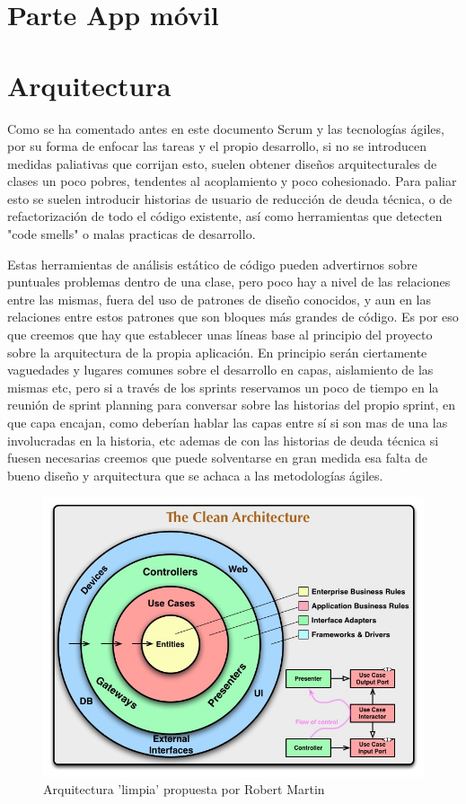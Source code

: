 \documentclass[../pfc.tex]{subfiles}
\begin{document}
	
	
	\section{Parte App móvil}
	
	\section{Arquitectura}
	
	Como se ha comentado antes en este documento Scrum y las tecnologías ágiles, por su forma de enfocar las tareas y el propio desarrollo, si no se introducen medidas paliativas que corrijan esto, suelen obtener diseños arquitecturales de clases un poco pobres, tendentes al acoplamiento y poco cohesionado. Para paliar esto se suelen introducir historias de usuario de reducción de deuda técnica, o de refactorización de todo el código existente, así como herramientas que detecten "code smells"\cite{cleancode} o malas practicas de desarrollo. 
	
	Estas herramientas de análisis estático de código pueden advertirnos sobre puntuales problemas dentro de una clase, pero poco hay a nivel de las relaciones entre las mismas, fuera del uso de patrones de diseño conocidos, y aun en las relaciones entre estos patrones que son bloques más grandes de código. Es por eso que creemos que hay que establecer unas líneas base al principio del proyecto sobre la arquitectura de la propia aplicación. En principio serán ciertamente vaguedades y lugares comunes sobre el desarrollo en capas, aislamiento de las mismas etc, pero si a través de los sprints reservamos un poco de tiempo en la reunión de sprint planning para conversar sobre las historias del propio sprint, en que capa encajan, como deberían hablar las capas entre sí si son mas de una las involucradas en la historia, etc ademas de con las historias de deuda técnica si fuesen necesarias creemos que puede solventarse en gran medida esa falta de bueno diseño y arquitectura que se achaca a las metodologías ágiles.\\
	

		\begin{figure}[h]
			\centering
			\includegraphics[width=0.8\linewidth]{../images/CleanArchitecture}
			\caption{Arquitectura 'limpia' propuesta por Robert Martin}
			\label{fig:cleanarch}
		\end{figure}
	
\end{document}
